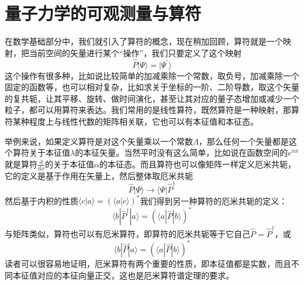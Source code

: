 \documentclass[12pt,a4paper,openany,twoside]{book}
\numberwithin{equation}{section}
\newcommand{\ud}{\mathrm{d}}
\begin{document}
      \section{量子力学的可观测量与算符}
        在数学基础部分中，我们就引入了算符的概念，现在稍加回顾，算符就是一个映射，把当前空间的矢量进行某个“操作”，我们只要定义了这个映射
        \begin{equation}
          \hat{P} | \Psi \rangle = | \Psi^{\prime} \rangle
        \end{equation}这个操作有很多种，比如说比较简单的加减乘除一个常数，取负号，加减乘除一个固定的函数等，也可以相对复杂，比如求关于坐标的一阶、二阶导数，取这个矢量的复共轭，让其平移、旋转、做时间演化，甚至让其对应的量子态增加或减少一个粒子，都可以用算符来表达。我们常用的是线性算符，既然算符是一种映射，那算符某种程度上与线性代数的矩阵相关联，它也可以有本征值和本征态。

        举例来说，如果定义算符是对这个矢量乘以一个常数$\Lambda$，那么任何一个矢量都是这个算符关于本征值$\lambda$的本征矢量。当然平时没有这么简单，比如说在函数空间的$e^{\alpha x}$就是算符$ \frac{\ud }{\ud x} $的关于本征值$\alpha$的本征态。而且算符也可以像矩阵一样定义厄米共轭，它的定义是基于作用在矢量上，然后整体取厄米共轭
        \begin{equation}
          \hat{P} | \Psi \rangle  \rightarrow  \langle \Psi | \hat{P}^{\dagger}
        \end{equation}
        然后基于内积的性质$\langle c | a\rangle=(\langle a | c\rangle)^{*}$我们得到另一种算符的厄米共轭的定义：
        \begin{equation}
          \langle b|\hat{P}^{\dagger}| a\rangle=(\langle a|\hat{P}| b\rangle)^{*}
          \label{adjoint}
        \end{equation}
        与矩阵类似，算符也可以有厄米算符，即算符的厄米共轭等于它自己$\hat{P}=\hat{P}^{\dagger}$，或
        \begin{equation}
          \langle b|\hat{P}| a\rangle=(\langle a|\hat{P}| b\rangle)^{*}
          \label{hermite operator}
        \end{equation}
        读者可以很容易地证明，厄米算符有两个重要的性质，即本征值都是实数，而且不同本征值对应的本征向量正交，这也是厄米算符谱定理的要求。
\end{document}
